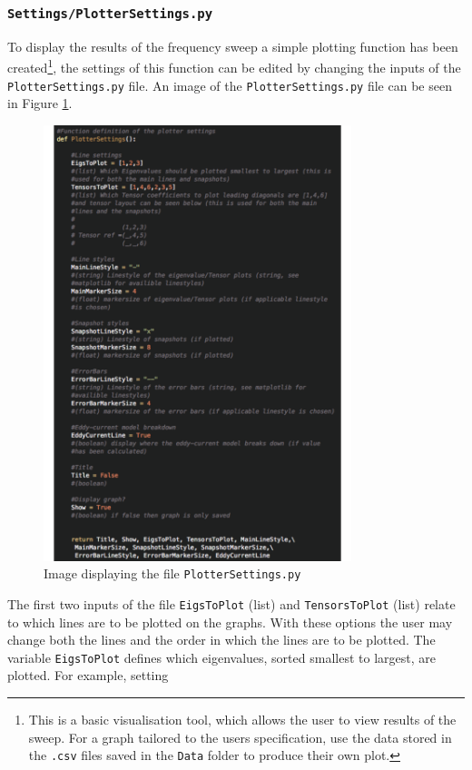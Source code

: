 \subsubsection{\texttt{Settings/PlotterSettings.py}}\label{sectPlotterSettings.py}
To display the results of the frequency sweep a simple plotting function has been created\footnote{This is a basic visualisation tool, which allows the user to view results of the sweep. For a graph tailored to the users specification, use the data stored in the \texttt{.csv} files saved in the \texttt{Data} folder to produce their own plot.}, the settings of this function can be edited by changing the inputs of the \texttt{PlotterSettings.py} file. An image of the \texttt{PlotterSettings.py} file can be seen in Figure \ref{fig:PlotterSettings.py}. 
\begin{figure}[H]
\begin{center}
\includegraphics[width=0.8\textwidth]{Figures/PlotterSettingspy}
\caption{Image displaying the file \texttt{PlotterSettings.py}}\label{fig:PlotterSettings.py}
\end{center}
\end{figure}
\noindent
The first two inputs of the file \texttt{EigsToPlot} (list) and \texttt{TensorsToPlot} (list) relate to which lines are to be plotted on the graphs. With these options the user may change both the lines and the order in which the lines are to be plotted. The variable \texttt{EigsToPlot} defines which eigenvalues, sorted smallest to largest, are plotted. For example, setting\\
